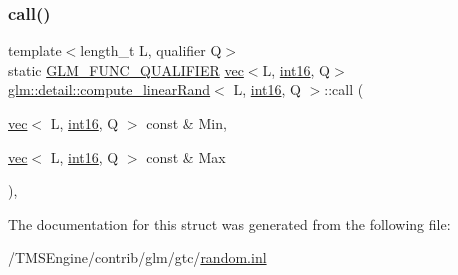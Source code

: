 \subsubsection{\texorpdfstring{call()}{call()}}
{\footnotesize\ttfamily template$<$length\+\_\+t L, qualifier Q$>$ \\
static \hyperlink{setup_8hpp_a33fdea6f91c5f834105f7415e2a64407}{G\+L\+M\+\_\+\+F\+U\+N\+C\+\_\+\+Q\+U\+A\+L\+I\+F\+I\+ER} \hyperlink{structglm_1_1vec}{vec}$<$L, \hyperlink{namespaceglm_1_1detail_a375938874ca4f0a0982ec6373b56117b}{int16}, Q$>$ \hyperlink{structglm_1_1detail_1_1compute__linear_rand}{glm\+::detail\+::compute\+\_\+linear\+Rand}$<$ L, \hyperlink{namespaceglm_1_1detail_a375938874ca4f0a0982ec6373b56117b}{int16}, Q $>$\+::call (\begin{DoxyParamCaption}\item[{\hyperlink{structglm_1_1vec}{vec}$<$ L, \hyperlink{namespaceglm_1_1detail_a375938874ca4f0a0982ec6373b56117b}{int16}, Q $>$ const \&}]{Min,  }\item[{\hyperlink{structglm_1_1vec}{vec}$<$ L, \hyperlink{namespaceglm_1_1detail_a375938874ca4f0a0982ec6373b56117b}{int16}, Q $>$ const \&}]{Max }\end{DoxyParamCaption})\hspace{0.3cm}{\ttfamily [inline]}, {\ttfamily [static]}}



The documentation for this struct was generated from the following file\+:\begin{DoxyCompactItemize}
\item 
/\+T\+M\+S\+Engine/contrib/glm/gtc/\hyperlink{random_8inl}{random.\+inl}\end{DoxyCompactItemize}
